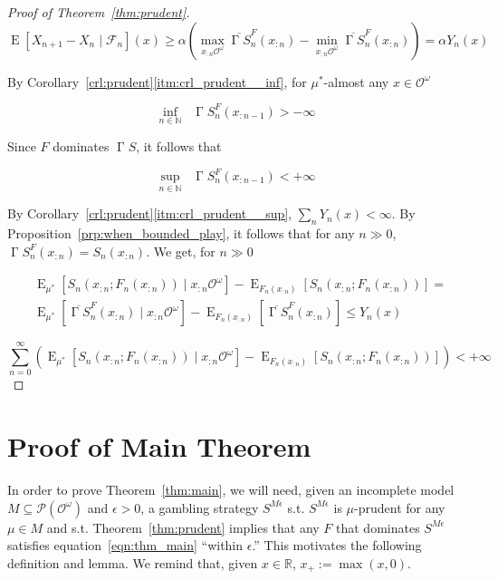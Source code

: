 \documentclass[11pt]{article}
\theoremstyle{definition}
\theoremstyle{plain}
\newcommand{\Nats}{\mathbb{N}}
\newcommand{\Reals}{\mathbb{R}}
\DeclareMathOperator{\E}{E}
\newcommand{\PM}{\mathcal{P}}
\newcommand{\Ob}{\mathcal{O}}
\newcommand{\OO}{\Ob^\omega}
\newcommand{\PMO}{\PM(\OO)}
\DeclareMathOperator{\SVM}{\Sigma V_{\min}}
\DeclareMathOperator{\SVX}{\Sigma V_{\max}}
\DeclareMathOperator{\PG}{\Gamma}
\newcommand{\F}{\mathcal{F}}
\begin{document}
\begin{proof}[Proof of Theorem~\ref{thm:prudent}]
$$\E\left[X_{n+1} - X_n \mid \F_n\right]\left(x\right) \geq \alpha \left(\max_{x_{:n}\OO} \overline{\PG{S}}_{n}^F\left(x_{:n}\right) - \min_{x_{:n}\OO} \overline{\PG{S}}_{n}^F\left(x_{:n}\right)\right) = \alpha Y_n\left(x\right)$$

By Corollary~\ref*{crl:prudent}\ref{itm:crl_prudent__inf}, for $\mu^*$-almost any $x \in \OO$

\[\inf_{n \in \Nats} \SVM \PG{S}^F_{n}\left(x_{:n-1}\right) > -\infty\]

Since $F$ dominates $\PG{S}$, it follows that

\[\sup_{n \in \Nats} \SVX \PG{S}^F_{n}\left(x_{:n-1}\right) < +\infty\] 

By Corollary~\ref*{crl:prudent}\ref{itm:crl_prudent__sup}, $\sum_n Y_n\left(x\right) < \infty$. By Proposition~\ref{prp:when_bounded_play}, it follows that for any $n \gg 0$, $\PG{S}^F_n\left(x_{:n}\right) = S_n\left(x_{:n}\right)$. We get, for $n \gg 0$

\begin{align*}
&\E_{\mu^*}\left[S_n\left(x_{:n};F_n\left(x_{:n}\right)\right) \mid x_{:n}\OO\right]-\E_{F_n\left(x_{:n}\right)}\left[S_n\left(x_{:n};F_n\left(x_{:n}\right)\right)\right] = \\ 
&\E_{\mu^*}\left[\overline{\PG{S}}^F_n\left(x_{:n}\right) \mid x_{:n}\OO\right]-\E_{F_n\left(x_{:n}\right)}\left[\overline{\PG{S}}^F_n\left(x_{:n}\right)\right] \leq Y_n\left(x\right)
\end{align*}

$$\sum_{n=0}^\infty \left(\E_{\mu^*}\left[S_n\left(x_{:n};F_n\left(x_{:n}\right)\right) \mid x_{:n}\OO\right]-\E_{F_n\left(x_{:n}\right)}\left[S_n\left(x_{:n};F_n\left(x_{:n}\right)\right)\right]\right) < +\infty$$
\end{proof}

\section{Proof of Main Theorem}
\label{sec:construction}

In order to prove Theorem~\ref{thm:main}, we will need, given an incomplete model $M \subseteq \PMO$ and $\epsilon > 0$, a gambling strategy $S^{M\epsilon}$ s.t. $S^{M\epsilon}$ is $\mu$-prudent for any $\mu \in M$ and s.t. Theorem~\ref{thm:prudent} implies that any $F$ that dominates $S^{M\epsilon}$ satisfies equation~\ref{eqn:thm_main} \enquote{within $\epsilon$.} This motivates the following definition and lemma. We remind that, given $x \in \Reals$, $x_+:=\max(x,0)$.
\end{document}
